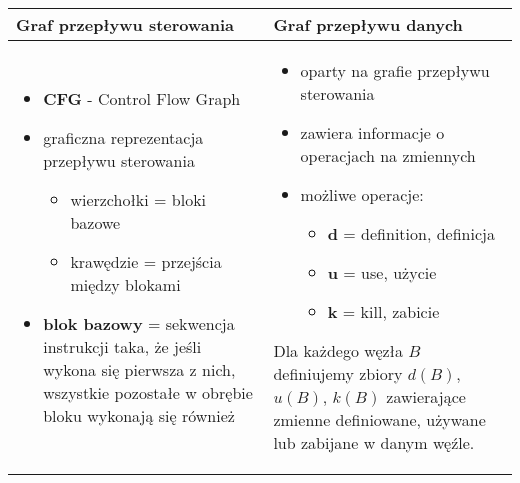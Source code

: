 \documentclass[../main.tex]{subfiles}
\begin{document}
    \begin{table}[H]
        \begin{center}
            \begin{tabular}{p{8cm} | p{8cm}}
                \textbf{Graf przepływu sterowania} & \textbf{Graf przepływu danych} \\
                \hline
                \hline
                \begin{itemize}
                    \item \textbf{CFG} - Control Flow Graph
                    \item graficzna reprezentacja przepływu sterowania
                    \begin{itemize}
                        \item wierzchołki = bloki bazowe
                        \item krawędzie = przejścia między blokami
                    \end{itemize}
                    \item \textbf{blok bazowy} = sekwencja instrukcji taka, że jeśli wykona się
                    pierwsza z nich, wszystkie pozostałe w obrębie bloku wykonają się również
                \end{itemize}
                &
                \begin{itemize}
                    \item oparty na grafie przepływu sterowania
                    \item zawiera informacje o operacjach na zmiennych
                    \item możliwe operacje:
                    \begin{itemize}
                        \item \textbf{d} = definition, definicja
                        \item \textbf{u} = use, użycie
                        \item \textbf{k} = kill, zabicie
                    \end{itemize}
                \end{itemize}

                Dla każdego węzła $B$ definiujemy zbiory $d(B)$, $u(B)$, $k(B)$ zawierające zmienne definiowane, używane lub
                zabijane w danym węźle.
                \\
            \end{tabular}
        \end{center}
    \end{table}
\end{document}

